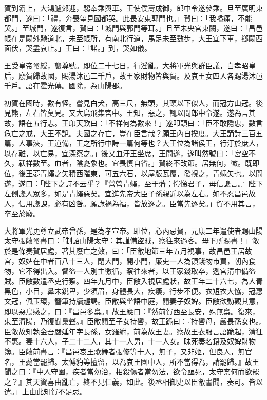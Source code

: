 \begin{pinyinscope}
賀到霸上，大鴻臚郊迎，騶奉乘輿車。王使僕壽成御，郎中令遂參乘。旦至廣明東都門，遂曰：「禮，奔喪望見國都哭。此長安東郭門也。」賀曰：「我嗌痛，不能哭。」至城門，遂復言，賀曰：「城門與郭門等耳。」且至未央宮東闕，遂曰：「昌邑帳在是闕外馳道北，未至帳所，有南北行道，馬足未至數步，大王宜下車，鄉闕西面伏，哭盡哀止。」王曰：「諾。」到，哭如儀。

王受皇帝璽綬，襲尊號。即位二十七日，行淫亂。大將軍光與群臣議，白孝昭皇后，廢賀歸故國，賜湯沐邑二千戶，故王家財物皆與賀。及哀王女四人各賜湯沐邑千戶。語在霍光傳。國除，為山陽郡。

初賀在國時，數有怪。嘗見白犬，高三尺，無頭，其頸以下似人，而冠方山冠。後見熊，左右皆莫見。又大鳥飛集宮中。王知，惡之，輒以問郎中令遂。遂為言其故，語在五行志。王卬天歎曰：「不祥何為數來！」遂叩頭曰：「臣不敢隱忠，數言危亡之戒，大王不說。夫國之存亡，豈在臣言哉？願王內自揆度。大王誦詩三百五篇，人事浹，王道備，王之所行中詩一篇何等也？大王位為諸侯王，行汙於庶人，以存難，以亡易，宜深察之。」後又血汙王坐席，王問遂，遂叫然號曰：「宮空不久，祅祥數至。血者，陰憂象也。宜畏慎自省。」賀終不改節。居無何，徵。既即位，後王夢青蠅之矢積西階東，可五六石，以屋版瓦覆，發視之，青蠅矢也。以問遂，遂曰：「陛下之詩不云乎？『營營青蠅，至于藩；愷悌君子，毋信讒言。』陛下左側讒人眾多，如是青蠅惡矣。宜進先帝大臣子孫親近以為左右。如不忍昌邑故人，信用讒諛，必有凶咎。願詭禍為福，皆放逐之。臣當先逐矣。」賀不用其言，卒至於廢。

大將軍光更尊立武帝曾孫，是為孝宣帝。即位，心內忌賀，元康二年遣使者賜山陽太守張敞璽書曰：「制詔山陽太守：其謹備盜賊，察往來過客。毋下所賜書！」敞於是條奏賀居處，著其廢亡之效，曰：「臣敞地節三年五月視事，故昌邑王居故宮，奴婢在中者百八十三人，閉大門，開小門，廉吏一人為領錢物市買，朝內食物，它不得出入。督盜一人別主徼循，察往來者，以王家錢取卒，迾宮清中備盜賊。臣敞數遣丞吏行察。四年九月中，臣敞入視居處狀，故王年二十六七，為人青黑色，小目，鼻末銳卑，少須眉，身體長大，疾痿，行步不便。衣短衣大恊，冠惠文冠，佩玉環，簪筆持牘趨謁。臣敞與坐語中庭，閱妻子奴婢。臣敞欲動觀其意，即以惡鳥感之，曰：『昌邑多梟。』故王應曰：『然前賀西至長安，殊無梟。復來，東至濟陽，乃復聞梟聲。』臣敞閱至子女持轡，故王跪曰：『持轡母，嚴長孫女也。』臣敞故知執金吾嚴延年字長孫，女羅紨，前為故王妻。察故王衣服言語跪起，清狂不惠。妻十六人，子二十二人，其十一人男，十一人女。昧死奏名籍及奴婢財物簿。臣敞前書言：『昌邑哀王歌舞者張修等十人，無子，又非姬，但良人，無官名，王薨當罷歸。太傅豹等擅留，以為哀王園中人，所不當得為，請罷歸。』故王聞之曰：『中人守園，疾者當勿治，相殺傷者當勿法，欲令亟死，太守柰何而欲罷之？』其天資喜由亂亡，終不見仁義，如此。後丞相御史以臣敞書聞，奏可。皆以遣。」上由此知賀不足忌。


\end{pinyinscope}

